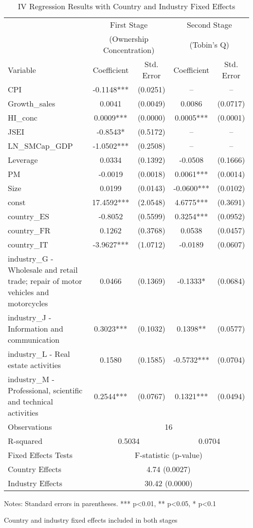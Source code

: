 \begin{table}[htbp]
\centering
\caption{IV Regression Results with Country and Industry Fixed Effects}
\label{tab:heterogeneity}
\begin{tabular}{lcccc}
\hline\hline
& \multicolumn{2}{c}{First Stage} & \multicolumn{2}{c}{Second Stage} \\
& \multicolumn{2}{c}{(Ownership Concentration)} & \multicolumn{2}{c}{(Tobin's Q)} \\
\cline{2-3} \cline{4-5}
Variable & Coefficient & Std. Error & Coefficient & Std. Error \\
CPI & -0.1148*** & (0.0251) & -- & -- \\
Growth_sales & 0.0041 & (0.0049) & 0.0086 & (0.0717) \\
HI_conc & 0.0009*** & (0.0000) & 0.0005*** & (0.0001) \\
JSEI & -0.8543* & (0.5172) & -- & -- \\
LN_SMCap_GDP & -1.0502*** & (0.2508) & -- & -- \\
Leverage & 0.0334 & (0.1392) & -0.0508 & (0.1666) \\
PM & -0.0019 & (0.0018) & 0.0061*** & (0.0014) \\
Size & 0.0199 & (0.0143) & -0.0600*** & (0.0102) \\
const & 17.4592*** & (2.0548) & 4.6775*** & (0.3691) \\
country_ES & -0.8052 & (0.5599) & 0.3254*** & (0.0952) \\
country_FR & 0.1262 & (0.3768) & 0.0538 & (0.0457) \\
country_IT & -3.9627*** & (1.0712) & -0.0189 & (0.0607) \\
industry_G - Wholesale and retail trade; repair of motor vehicles and motorcycles & 0.0466 & (0.1369) & -0.1333* & (0.0684) \\
industry_J - Information and communication & 0.3023*** & (0.1032) & 0.1398** & (0.0577) \\
industry_L - Real estate activities & 0.1580 & (0.1585) & -0.5732*** & (0.0704) \\
industry_M - Professional, scientific and technical activities & 0.2544*** & (0.0767) & 0.1321*** & (0.0494) \\
\hline
Observations & \multicolumn{4}{c}{16} \\
R-squared & \multicolumn{2}{c}{0.5034} & \multicolumn{2}{c}{0.0704} \\

Fixed Effects Tests & \multicolumn{4}{c}{F-statistic (p-value)} \\
Country Effects & \multicolumn{4}{c}{4.74 (0.0027)} \\
Industry Effects & \multicolumn{4}{c}{30.42 (0.0000)} \\
\hline\hline
\end{tabular}
\begin{tablenotes}
\small
\item Notes: Standard errors in parentheses. *** p<0.01, ** p<0.05, * p<0.1
\item Country and industry fixed effects included in both stages
\end{tablenotes}
\end{table}